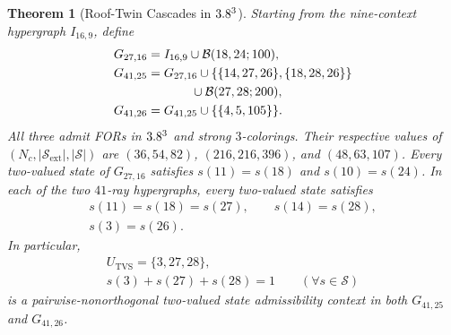 \documentclass[aps,pra,reprint,superscriptaddress,longbibliography,nofootinbib,floatfix,10pt]{revtex4-2}
\newtheorem{theorem}{Theorem}
\theoremstyle{definition}\newtheorem{definition}[theorem]{Definition}
\theoremstyle{remark}\newtheorem{remark}[theorem]{Remark}
\newcommand{\Sc}{\mathcal S}\newcommand{\Cc}{\mathcal C}\newcommand{\Wc}{\mathcal W}
\begin{document}
\begin{theorem}[Roof-Twin Cascades in $3.8^3$]\label{thm:tvs-admissibility}
Starting from the nine-context hypergraph $I_{16,9}$, define
\begin{align*}
G_{27,16}&=I_{16,9}\cup \mathcal B(18,24;100),\\
G_{41,25}&=G_{27,16}\cup\{\{14,27,26\},\{18,28,26\}\}\\
&\hspace{3.5em}\cup \mathcal B(27,28;200),\\
G_{41,26}&=G_{41,25}\cup\{\{4,5,105\}\}.
\end{align*}
All three admit FORs in $3.8^3$ and strong $3$-colorings. Their respective values of $(N_c,|\Sc_{\mathrm{ext}}|,|\Sc|)$ are
$(36,54,82)$, $(216,216,396)$, and $(48,63,107)$.
Every two-valued state of $G_{27,16}$ satisfies $s(11)=s(18)$ and $s(10)=s(24)$. In each of the two $41$-ray hypergraphs, every two-valued state satisfies
\begin{equation}\label{eq:G41-twins}
\begin{gathered}
s(11)=s(18)=s(27),\qquad s(14)=s(28),\\
s(3)=s(26).
\end{gathered}
\end{equation}
In particular,
\begin{equation}\label{eq:U-TVS}
\begin{gathered}
U_{\mathrm{TVS}}=\{3,27,28\},\\
s(3)+s(27)+s(28)=1\qquad(\forall s\in\Sc)
\end{gathered}
\end{equation}
is a pairwise-nonorthogonal two-valued state admissibility context in both $G_{41,25}$ and $G_{41,26}$.
\end{theorem}
\end{document}
